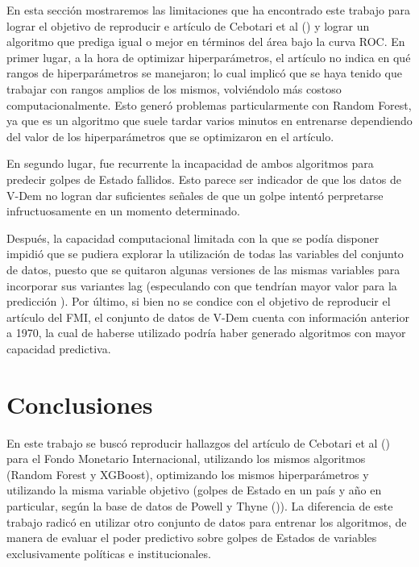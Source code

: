 \documentclass{article}
\begin{document}
En esta sección mostraremos las limitaciones que ha encontrado este trabajo para lograr el objetivo de
reproducir e artículo de Cebotari et al (\citeyear{Ceb24}) y lograr un algoritmo que prediga igual o mejor
en términos del área bajo la curva ROC. En primer lugar, a la hora de optimizar hiperparámetros, el artículo
no indica en qué rangos de hiperparámetros se manejaron; lo cual implicó que se haya tenido que trabajar
con rangos amplios de los mismos, volviéndolo más costoso computacionalmente. Esto generó problemas
particularmente con Random Forest, ya que es un algoritmo que suele tardar varios minutos en entrenarse 
dependiendo del valor de los hiperparámetros que se optimizaron en el artículo.

En segundo lugar, fue recurrente la incapacidad de ambos algoritmos para predecir golpes de Estado fallidos.
Esto parece ser indicador de que los datos de V-Dem no logran dar suficientes señales de que un golpe intentó
perpretarse infructuosamente en un momento determinado.

Después, la capacidad computacional limitada con la que se podía disponer impidió que se pudiera explorar
la utilización de todas las variables del conjunto de datos, puesto que se quitaron algunas versiones de las 
mismas variables para incorporar sus variantes lag (especulando con que tendrían mayor valor para la predicción
). Por último, si bien no se condice con el objetivo de reproducir el artículo del FMI, el conjunto de
datos de V-Dem cuenta con información anterior a 1970, la cual de haberse utilizado podría haber
generado algoritmos con mayor capacidad predictiva.

\section{Conclusiones}
En este trabajo se buscó reproducir hallazgos del artículo de Cebotari et al (\citeyear{Ceb24})
para el Fondo Monetario Internacional, utilizando los mismos algoritmos (Random Forest y XGBoost), optimizando
los mismos hiperparámetros y utilizando la misma variable objetivo (golpes de Estado en un país y año en
particular, según la base de datos de Powell y Thyne (\citeyear{Pow11})). La diferencia de este trabajo radicó
en utilizar otro conjunto de datos para entrenar los algoritmos, de manera de evaluar el poder predictivo
sobre golpes de Estados de variables exclusivamente políticas e institucionales.
\end{document}
